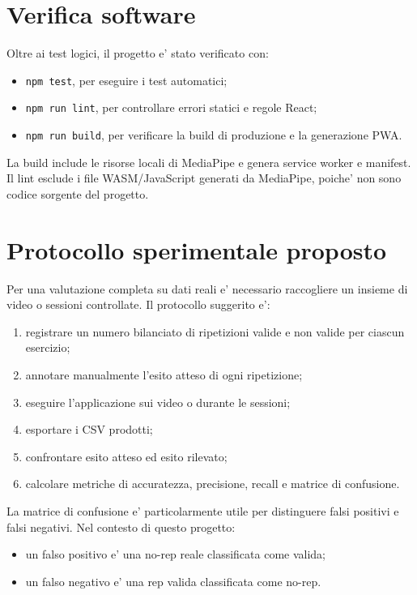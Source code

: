 \section{Verifica software}

Oltre ai test logici, il progetto e' stato verificato con:

\begin{itemize}
  \item \texttt{npm test}, per eseguire i test automatici;
  \item \texttt{npm run lint}, per controllare errori statici e regole React;
  \item \texttt{npm run build}, per verificare la build di produzione e la generazione PWA.
\end{itemize}

La build include le risorse locali di MediaPipe e genera service worker e manifest. Il lint esclude i file WASM/JavaScript generati da MediaPipe, poiche' non sono codice sorgente del progetto.

\section{Protocollo sperimentale proposto}

Per una valutazione completa su dati reali e' necessario raccogliere un insieme di video o sessioni controllate. Il protocollo suggerito e':

\begin{enumerate}
  \item registrare un numero bilanciato di ripetizioni valide e non valide per ciascun esercizio;
  \item annotare manualmente l'esito atteso di ogni ripetizione;
  \item eseguire l'applicazione sui video o durante le sessioni;
  \item esportare i CSV prodotti;
  \item confrontare esito atteso ed esito rilevato;
  \item calcolare metriche di accuratezza, precisione, recall e matrice di confusione.
\end{enumerate}

La matrice di confusione e' particolarmente utile per distinguere falsi positivi e falsi negativi. Nel contesto di questo progetto:

\begin{itemize}
  \item un falso positivo e' una no-rep reale classificata come valida;
  \item un falso negativo e' una rep valida classificata come no-rep.
\end{itemize}

